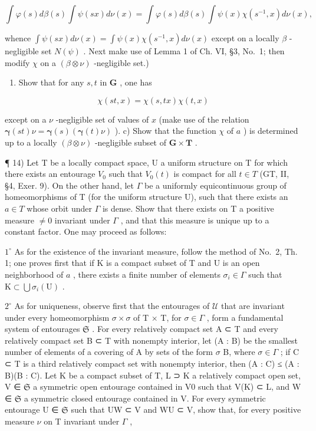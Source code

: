 \[
\int \varphi (s) d \beta (s) \int \psi (s x) d \nu (x) = \int \varphi (s) d \beta (s) \int \psi (x) \chi (s ^ {- 1}, x) d \nu (x),
\]

whence \(\int \psi(sx) d\nu(x) = \int \psi(x)\chi(s^{-1}, x) d\nu(x)\) except on a locally \(\beta\) -negligible set \(N(\psi)\) . Next make use of Lemma 1 of Ch. VI, §3, No.~1; then modify \(\chi\) on a \((\beta \otimes \nu)\) -negligible set.)

\begin{enumerate}
\def\labelenumi{\alph{enumi})}
\setcounter{enumi}{1}
\tightlist
\item
  Show that for any \(s, t\) in \(\mathbf{G}\) , one has
\end{enumerate}

\[
\chi (s t, x) = \chi (s, t x) \chi (t, x)
\]

except on a \(\nu\) -negligible set of values of \(x\) (make use of the relation \(\pmb{\gamma}(st)\nu = \pmb{\gamma}(s)(\pmb{\gamma}(t)\nu)\) ). c) Show that the function \(\chi\) of \(a\) ) is determined up to a locally \((\beta \otimes \nu)\) -negligible subset of \(\mathbf{G} \times \mathbf{T}\) .

¶ 14) Let T be a locally compact space, U a uniform structure on T for which there exists an entourage \(V_{0}\) such that \(V_{0}(t)\) is compact for all \(t \in T\) (GT, II, §4, Exer. 9). On the other hand, let \(\Gamma\) be a uniformly equicontinuous group of homeomorphisms of T (for the uniform structure U), such that there exists an \(a \in T\) whose orbit under \(\Gamma\) is dense. Show that there exists on T a positive measure \(\neq 0\) invariant under \(\Gamma\) , and that this measure is unique up to a constant factor. One may proceed as follows:

\(1^{\circ}\) As for the existence of the invariant measure, follow the method of No.~2, Th. 1; one proves first that if K is a compact subset of T and U is an open neighborhood of \(a\) , there exists a finite number of elements \(\sigma_{i} \in \Gamma\) such that \(\mathrm{K} \subset \bigcup \sigma_{i}(\mathrm{U})\) .

\(2^{\circ}\) As for uniqueness, observe first that the entourages of \(\mathcal{U}\) that are invariant under every homeomorphism \(\sigma \times \sigma\) of T × T, for \(\sigma \in \Gamma\) , form a fundamental system of entourages \(\mathfrak{S}\) . For every relatively compact set A ⊂ T and every relatively compact set B ⊂ T with nonempty interior, let (A : B) be the smallest number of elements of a covering of A by sets of the form \(\sigma\) B, where \(\sigma \in \Gamma\) ; if C ⊂ T is a third relatively compact set with nonempty interior, then (A : C) ≤ (A : B)(B : C). Let K be a compact subset of T, L ⊃ K a relatively compact open set, V ∈ \(\mathfrak{S}\) a symmetric open entourage contained in V0 such that V(K) ⊂ L, and W ∈ \(\mathfrak{S}\) a symmetric closed entourage contained in V. For every symmetric entourage U ∈ \(\mathfrak{S}\) such that UW ⊂ V and WU ⊂ V, show that, for every positive measure \(\nu\) on T invariant under \(\Gamma\) ,

